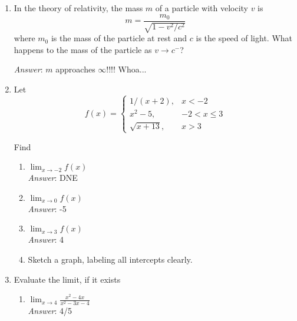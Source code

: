 \documentclass[11pt]{article}
\begin{document}
\begin{enumerate}
\begin{enumerate}
\end{enumerate}

\item In the theory of relativity, the mass $m$ of a particle with velocity $v$ is \[m=\frac{m_0}{\sqrt{1-v^2/c^2}}\] where $m_0$ is the mass of the particle at rest and $c$ is the speed of light. What happens to the mass of the particle as $v\rightarrow c^-$?

{\em Answer}: $m$ approaches $\infty$!!!! Whoa...


\item Let \[f(x)=\begin{cases} 1/(x+2), & x<-2 \\ x^2-5, & -2<x\leq 3 \\ \sqrt{x+13}, & x>3 \end{cases}\]

Find 

\begin{enumerate}

\item $\lim_{x\rightarrow -2}f(x)$\\

{\em Answer}: DNE\\

\item $\lim_{x\rightarrow 0}f(x)$\\

{\em Answer}: -5\\

\item $\lim_{x\rightarrow 3}f(x)$\\

{\em Answer}: 4\\

\item Sketch a graph, labeling all intercepts clearly.

\end{enumerate}

\item Evaluate the limit, if it exists\\

\begin{multicols}{2}

\begin{enumerate}

\item $\lim_{x\rightarrow 4}\frac{x^2-4x}{x^2-3x-4}$\\

{\em Answer}: 4/5\\



\end{enumerate}
\end{multicols}
\end{enumerate}
\end{document}
